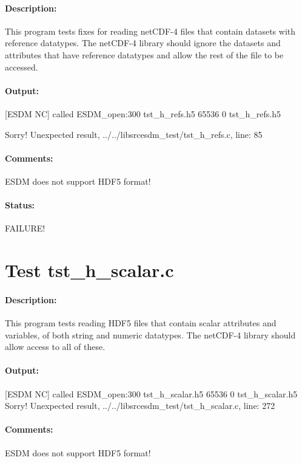 \paragraph{Description:} This program tests fixes for reading netCDF-4 files that contain datasets with reference datatypes.  The netCDF-4 library should ignore the datasets and attributes that have reference datatypes and allow the rest of the file to be accessed.

\paragraph{Output:} [ESDM NC] called ESDM\_open:300 tst\_h\_refs.h5 65536 0 tst\_h\_refs.h5

Sorry! Unexpected result, ../../libsrcesdm\_test/tst\_h\_refs.c, line: 85

\paragraph{Comments:} ESDM does not support HDF5 format!

\paragraph{Status:} FAILURE!

\section{Test tst\_h\_scalar.c}

\paragraph{Description:} This program tests reading HDF5 files that contain scalar attributes and variables, of both string and numeric datatypes.  The netCDF-4 library should allow access to all of these.

\paragraph{Output:} [ESDM NC] called ESDM\_open:300 tst\_h\_scalar.h5 65536 0 tst\_h\_scalar.h5
Sorry! Unexpected result, ../../libsrcesdm\_test/tst\_h\_scalar.c, line: 272

\paragraph{Comments:} ESDM does not support HDF5 format!

